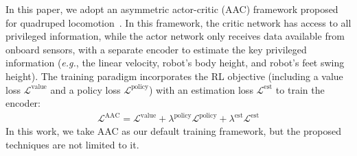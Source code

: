 In this paper, we adopt an asymmetric actor-critic (AAC) framework proposed for quadruped locomotion~\citep{sci2023defrmable}.
In this framework, the critic network has access to all privileged information, while the actor network only receives data available from onboard sensors, with a separate encoder to estimate the key privileged information (\textit{e.g.}, the linear velocity, robot's body height, and robot's feet swing height). The training paradigm incorporates the RL objective (including a value loss $\mathcal{L}^{\text{value}}$ and a policy loss $\mathcal{L}^{\text{policy}}$) with an estimation loss \citep{nahrendra2023dreamwaq, liu2024skill, sci2023defrmable} $\mathcal{L}^{\text{est}}$ to train the encoder:
\begin{equation}
\begin{aligned}
    \mathcal L^{\text{AAC}} = \mathcal L^{\text{value}} + \lambda^{\text{policy}} \mathcal L^{\text{policy}} + \lambda^{\text{est}} \mathcal{L}^{\text{est}}
\end{aligned}
\end{equation}
In this work, we take AAC as our default training framework, but the proposed techniques are not limited to it.